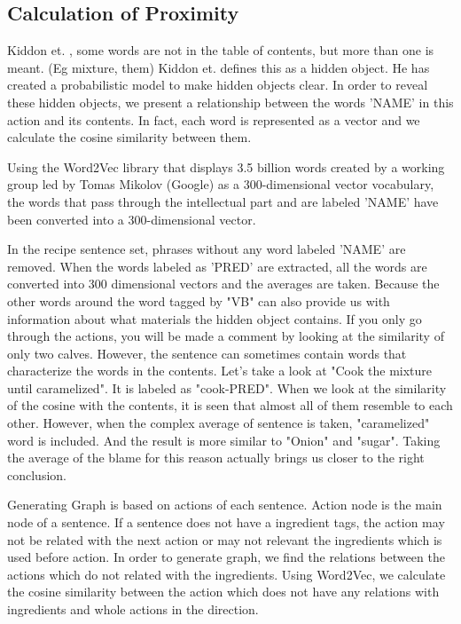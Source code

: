 \subsection{Calculation of Proximity}
Kiddon et.\cite{kiddon2015mise} , some words are not in the table of contents, but more than one is meant. (Eg mixture, them) Kiddon et.\cite{kiddon2015mise} defines this as a hidden object. He has created a probabilistic model to make hidden objects clear. In order to reveal these hidden objects, we present a relationship between the words 'NAME' in this action and its contents. In fact, each word is represented as a vector and we calculate the cosine similarity between them.

Using the Word2Vec \cite{word2vec} library that displays 3.5 billion words created by a working group led by Tomas Mikolov (Google) as a 300-dimensional vector vocabulary, the words that pass through the intellectual part and are labeled 'NAME' have been converted into a 300-dimensional vector. 

In the recipe sentence set, phrases without any word labeled 'NAME' are removed. When the words labeled as 'PRED' are extracted, all the words are converted into 300 dimensional vectors and the averages are taken. Because the other words around the word tagged by "VB" can also provide us with information about what materials the hidden object contains. If you only go through the actions, you will be made a comment by looking at the similarity of only two calves. However, the sentence can sometimes contain words that characterize the words in the contents. Let's take a look at "Cook the mixture until caramelized". It is labeled as "cook-PRED". When we look at the similarity of the cosine with the contents, it is seen that almost all of them resemble to each other. However, when the complex average of sentence is taken, "caramelized" word is included. And the result is more similar to "Onion" and "sugar". Taking the average of the blame for this reason actually brings us closer to the right conclusion. 

Generating Graph is based on actions of each sentence. Action node is the main node of a sentence. If a sentence does not have a ingredient tags, the action may not be related with the next action or may not relevant  the ingredients which is used before action. In order to generate graph, we find the relations between the actions which do not related with the ingredients.
Using Word2Vec, we calculate the cosine similarity between the action which does not have any relations with ingredients and whole actions in the direction.

